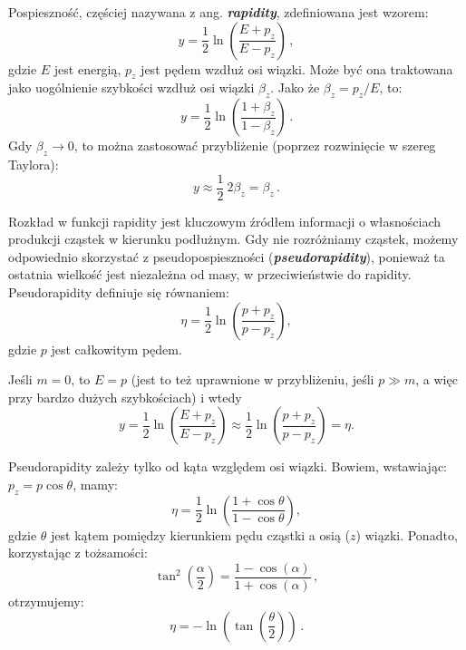 \documentclass[a4paper,12pt]{article}
\begin{document}
Pospieszność, częściej nazywana z ang. \textbf{\textit{rapidity}}, zdefiniowana jest wzorem: 
\begin{equation} \label{eq:rapid} 
y = \frac{1}{2} \ln \left( \frac{E + p_z}{E - p_z} \right)\,,
\end{equation}
gdzie $E$ jest energią, $p_z$ jest pędem wzdłuż osi wiązki. Może być ona traktowana jako uogólnienie szybkości wzdłuż osi wiązki $\beta_z$. Jako że $\beta_z = p_z / E$, to:
\begin{equation} \label{eq:rapid2}
y = \frac{1}{2} \ln \left( \frac{1 + \beta_z}{1 - \beta_z} \right)\,. 
\end{equation}
Gdy $\beta_z \to 0$, to można zastosować przybliżenie (poprzez rozwinięcie w szereg Taylora):
\begin{equation} \label{eq:rapid3}
y \approx \frac{1}{2} \ 2\beta_z = \beta_z \,.
\end{equation}

Rozkład w funkcji rapidity jest kluczowym źródłem informacji o własnościach produkcji cząstek w kierunku podłużnym. Gdy nie rozróżniamy cząstek, możemy odpowiednio skorzystać z pseudopospieszności (\textbf{\textit{pseudorapidity}}), ponieważ ta ostatnia wielkość jest niezależna od masy, w przeciwieństwie do rapidity. Pseudorapidity definiuje się równaniem:
\begin{equation} \label{eq:pseudorap}
\eta = \frac{1}{2} \ln \left( \frac{p + p_z}{p - p_z} \right),
\end{equation}
gdzie $p$ jest całkowitym pędem.

Jeśli $m = 0$, to $E = p$ (jest to też uprawnione w przybliżeniu, jeśli $p \gg m$, a więc przy bardzo dużych szybkościach) i wtedy
\begin{equation} \label{eq:rap-pseudorap}
 y = \frac{1}{2} \ln \left( \frac{E + p_z}{E - p_z} \right) \approx \frac{1}{2} \ln \left( \frac{p + p_z}{p - p_z} \right) = \eta. 
 \end{equation}
 
Pseudorapidity zależy tylko od kąta względem osi wiązki. Bowiem, wstawiając: $p_z = p \cos\theta$, mamy:
\begin{equation} \label{eq:pseudo1}
 \eta = \frac{1}{2} \ln \left( \frac{1 + \cos\theta}{1 - \cos\theta} \right) ,
 \end{equation}
gdzie $\theta$ jest kątem pomiędzy kierunkiem pędu cząstki a osią ($z$) wiązki. Ponadto, korzystając z tożsamości:
\begin{equation} \label{eq:tansq}
 \tan^2 \left( \frac{\alpha}{2}  \right) = \frac{1 - \cos(\alpha)}{1 + \cos(\alpha)}\,,
 \end{equation}
otrzymujemy:
\begin{equation} \label{eq:pseudorap2}
\eta = - \ln \left( \tan \left( \frac{\theta}{2} \right) \right)\,.
\end{equation}
\end{document}
